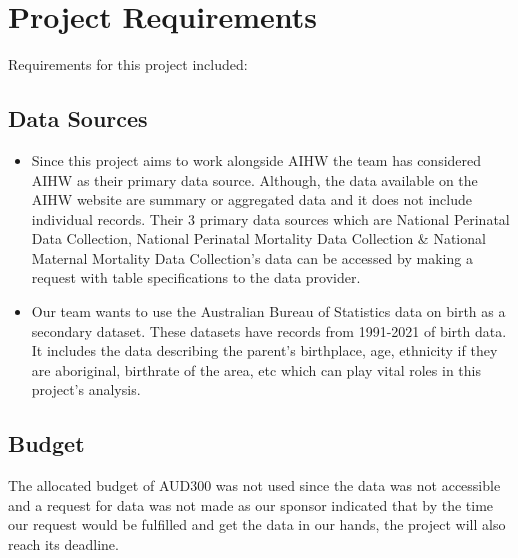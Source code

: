 \section{Project Requirements}
Requirements for this project included:
\subsection{Data Sources}
\begin{itemize}
  \item Since this project aims to work alongside AIHW the team has considered AIHW as their primary data source. Although, the data available on the AIHW website are summary or aggregated data and it does not include individual records. Their 3 primary data sources which are National Perinatal Data Collection, National Perinatal Mortality Data Collection \& National Maternal Mortality Data Collection’s data can be accessed by making a request with table specifications to the data provider.
  \item Our team wants to use the Australian Bureau of Statistics data on birth as a secondary dataset. These datasets have records from 1991-2021 of birth data. It includes the data describing the parent’s birthplace, age, ethnicity if they are aboriginal, birthrate of the area, etc which can play vital roles in this project’s analysis.
\end{itemize}

\subsection{Budget}
The allocated budget of AUD300 was not used since the data was not accessible and a request for data was not made as our sponsor indicated that by the time our request would be fulfilled and get the data in our hands, the project will also reach its deadline.
